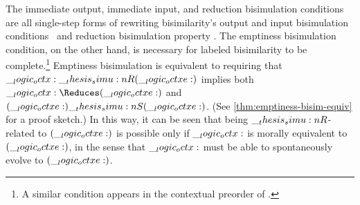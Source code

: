 The immediate output, immediate input, and reduction bisimulation conditions are all single-step forms of rewriting bisimilarity's output and input bisimulation conditions~ and reduction bisimulation property .
The emptiness bisimulation condition, on the other hand, is necessary for labeled bisimilarity to be complete.\footnote[][0.5\baselineskip]{A similar condition appears in the contextual preorder of \textcite{Deng+:MSCS16}.}
Emptiness bisimulation is equivalent to requiring that $\__logic_octx: \__thesis_simu:n {R} (\__logic_octxe:)$ implies both $\octx \Reduces (\octxe)$ and $(\__logic_octxe:) \__thesis_simu:n {S} (\__logic_octxe:)$.
(See \cref{thm:emptiness-bisim-equiv} for a proof sketch.)
In this way, it can be seen that being $\__thesis_simu:n {R}$-related to $(\__logic_octxe:)$ is possible only if $\__logic_octx:$ is morally equivalent to $(\__logic_octxe:)$, in the sense that $\__logic_octx:$ must be able to spontaneously evolve to $(\__logic_octxe:)$.






